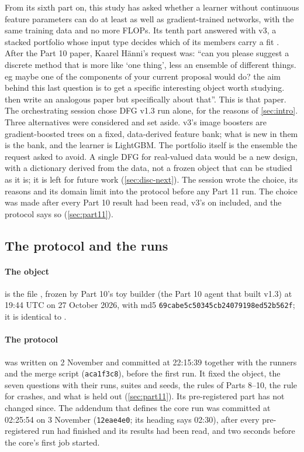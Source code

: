From its sixth part on, this study has asked whether a learner without continuous feature parameters can do at least as well as gradient-trained networks, with the same training data and no more FLOPs. Its tenth part answered with v3, a stacked portfolio whose input type decides which of its members carry a fit \cite{portfoliolearner2026}. After the Part 10 paper, Kaarel H\"anni's request was: ``can you please suggest a discrete method that is more like `one thing', less an ensemble of different things. eg maybe one of the components of your current proposal would do? the aim behind this last question is to get a specific interesting object worth studying. then write an analogous paper but specifically about that''. This is that paper. The orchestrating session chose DFG v1.3 run alone, for the reasons of \cref{sec:intro}. Three alternatives were considered and set aside. v3's image boosters are gradient-boosted trees on a fixed, data-derived feature bank; what is new in them is the bank, and the learner is LightGBM. The portfolio itself is the ensemble the request asked to avoid. A single DFG for real-valued data would be a new design, with a dictionary derived from the data, not a frozen object that can be studied as it is; it is left for future work (\cref{sec:disc-next}). The session wrote the choice, its reasons and its domain limit into the protocol before any Part 11 run. The choice was made after every Part 10 result had been read, v3's on  included, and the protocol says so (\cref{sec:part11}).

\subsection{The protocol and the runs}\label{app:runs}

\paragraph{The object} is the file , frozen by Part 10's toy builder (the Part 10 agent that built v1.3) at 19:44 UTC on 27 October 2026, with md5 \texttt{69cabe5c50345cb24079198ed52b562f}; it is identical to .

\paragraph{The protocol} was written on 2 November and committed at 22:15:39 together with the runners and the merge script (\texttt{aca1f3c8}), before the first run. It fixed the object, the seven questions with their runs, suites and seeds, the rules of Parts 8--10, the rule for crashes, and what is held out (\cref{sec:part11}). Its pre-registered part has not changed since. The addendum that defines the core run was committed at 02:25:54 on 3 November (\texttt{12eae4e0}; its heading says 02:30), after every pre-registered run had finished and its results had been read, and two seconds before the core's first job started.

